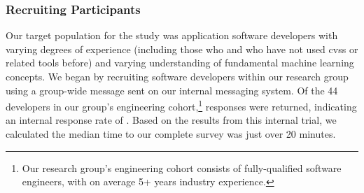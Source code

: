 \subsubsection{Recruiting Participants}

Our target population for the study was application software developers with varying degrees of experience (including those who and who have not used \glspl{cvs} or related tools before) and varying understanding of fundamental machine learning concepts. We began by recruiting software developers within our research group using a group-wide message sent on our internal messaging system. Of the 44 developers in our group's engineering cohort,\footnote{Our research group's engineering cohort consists of fully-qualified software engineers, with on average 5+ years industry experience.} \SurveyParticipantsInternal{} responses were returned, indicating an internal response rate of \SurveyParticipantsInternalResponseRate{}. Based on the \SurveyParticipantsInternal{} results from this internal trial, we calculated the median time to our complete survey was just over 20 minutes.

